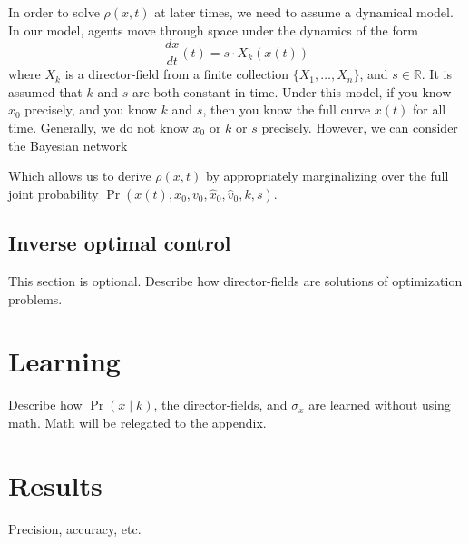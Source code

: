 \documentclass[conference]{IEEEtran}
\begin{document}
In order to solve $\rho(x,t)$ at later times, we need to assume a dynamical model.
In our model, agents move through space under the dynamics of the form
$$
	\frac{dx}{dt}(t) = s \cdot X_k(x(t))
$$
where $X_k$ is a director-field from a finite collection $\{X_1, \dots, X_n\}$, and $s \in \mathbb{R}$.
It is assumed that $k$ and $s$ are both constant in time.
Under this model, if you know $x_0$ precisely, and you know $k$ and $s$, then you know the full curve $x(t)$ for all time.
Generally, we do not know $x_0$ or $k$ or $s$ precisely.
However, we can consider the Bayesian network
\begin{center}
\end{center}
Which allows us to derive $\rho(x,t)$ by appropriately marginalizing over the full joint probability $\Pr(x(t), x_0, v_0, \hat{x}_0, \hat{v}_0, k, s)$.

\subsection{Inverse optimal control}
This section is optional.  Describe how director-fields are solutions of optimization problems.

\section{Learning}
  Describe how $\Pr(x \mid k)$, the director-fields, and $\sigma_x$ are learned without using math.
  Math will be relegated to the appendix.
  
\section{Results}
 Precision, accuracy, etc.
\end{document}
